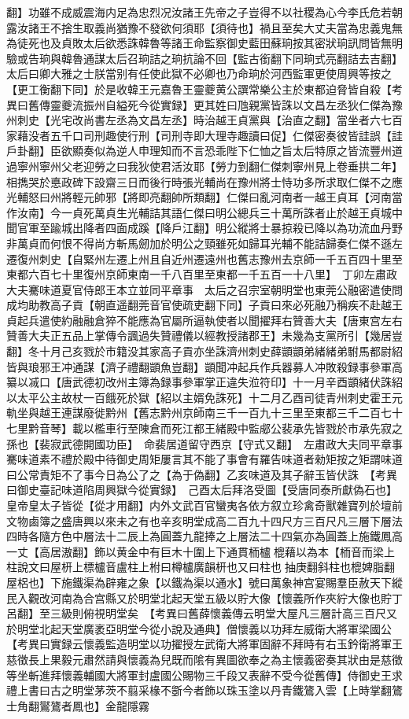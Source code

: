 翻】功雖不成威震海内足為忠烈况汝諸王先帝之子豈得不以社稷為心今李氏危若朝露汝諸王不捨生取義尚猶豫不發欲何須耶【須待也】禍且至矣大丈夫當為忠義鬼無為徒死也及貞敗太后欲悉誅韓魯等諸王命監察御史藍田蘇珦按其密狀珦訊問皆無明驗或告珦與韓魯通謀太后召珦詰之珦抗論不回【監古銜翻下同珦式亮翻詰去吉翻】太后曰卿大雅之士朕當别有任使此獄不必卿也乃命珦於河西監軍更使周興等按之【更工衡翻下同】於是收韓王元嘉魯王靈夔黄公譔常樂公主於東都迫脅皆自殺【考異曰舊傳靈夔流振州自縊死今從實録】更其姓曰虺親黨皆誅以文昌左丞狄仁傑為豫州刺史【光宅改尚書左丞為文昌左丞】時治越王貞黨與【治直之翻】當坐者六七百家藉没者五千口司刑趣使行刑【司刑寺即大理寺趣讀曰促】仁傑密奏彼皆詿誤【詿戶卦翻】臣欲顯奏似為逆人申理知而不言恐乖陛下仁恤之旨太后特原之皆流豐州道過寧州寧州父老迎勞之曰我狄使君活汝耶【勞力到翻仁傑刺寧州見上卷垂拱二年】相擕哭於悳政碑下設齋三日而後行時張光輔尚在豫州將士恃功多所求取仁傑不之應光輔怒曰州將輕元帥邪【將即亮翻帥所類翻】仁傑曰亂河南者一越王貞耳【河南當作汝南】今一貞死萬貞生光輔詰其語仁傑曰明公總兵三十萬所誅者止於越王貞城中聞官軍至踰城出降者四面成蹊【降戶江翻】明公縱將士暴掠殺已降以為功流血丹野非萬貞而何恨不得尚方斬馬劒加於明公之頸雖死如歸耳光輔不能詰歸奏仁傑不遜左遷復州刺史【自緊州左遷上州且自近州遷遠州也舊志豫州去京師一千五百四十里至東都六百七十里復州京師東南一千八百里至東都一千五百一十八里】　丁卯左肅政大夫騫味道夏官侍郎王本立並同平章事　太后之召宗室朝明堂也東莞公融密遣使問成均助教高子貢【朝直遥翻莞音官使疏吏翻下同】子貢曰來必死融乃稱疾不赴越王貞起兵遣使約融融倉猝不能應為官屬所逼執使者以聞擢拜右贊善大夫【唐東宫左右贊善大夫正五品上掌傳令諷過失贊禮儀以經教授諸郡王】未幾為支黨所引【幾居豈翻】冬十月己亥戮於市籍没其家高子貢亦坐誅濟州刺史薛顗顗弟緒緒弟駙馬都尉紹皆與琅邪王冲通謀【濟子禮翻顗魚豈翻】顗聞冲起兵作兵器募人冲敗殺録事參軍高纂以㓕口【唐武德初改州主簿為録事參軍掌正違失涖符印】十一月辛酉顗緒伏誅紹以太平公主故杖一百餓死於獄【紹以主婿免誅死】十二月乙酉司徒青州刺史霍王元軌坐與越王連謀廢徙黔州【舊志黔州京師南三千一百九十三里至東都三千二百七十七里黔音琴】載以檻車行至陳倉而死江都王緒殿中監郕公裴承先皆戮於市承先寂之孫也【裴寂武德開國功臣】　命裴居道留守西京【守式又翻】　左肅政大夫同平章事騫味道素不禮於殿中待御史周矩屢言其不能了事會有羅告味道者勑矩按之矩謂味道曰公常責矩不了事今日為公了之【為于偽翻】乙亥味道及其子辭玉皆伏誅　【考異曰御史臺記味道陷周興獄今從實録】　己酉太后拜洛受圖【受唐同泰所獻偽石也】皇帝皇太子皆從【從才用翻】内外文武百官蠻夷各依方叙立珍禽奇獸雜寶列於壇前文物鹵簿之盛唐興以來未之有也辛亥明堂成高二百九十四尺方三百尺凡三層下層法四時各隨方色中層法十二辰上為圓蓋九龍捧之上層法二十四氣亦為圓蓋上施鐵鳳高一丈【高居滶翻】飾以黄金中有巨木十圍上下通貫栭櫨㮰藉以為本【栭音而梁上柱說文曰屋枅上標櫨音盧柱上柎曰樽櫨廣韻枅也又曰柱也抽庚翻斜柱也㮰婢脂翻屋梠也】下施鐵渠為辟雍之象【以鐵為渠以通水】號曰萬象神宫宴賜羣臣赦天下縱民入觀改河南為合宫縣又於明堂北起天堂五級以貯大像【懷義所作夾紵大像也貯丁呂翻】至三級則俯視明堂矣　【考異曰舊薛懷義傳云明堂大屋凡三層計高三百尺又於明堂北起天堂廣袤亞明堂今從小說及通典】僧懷義以功拜左威衛大將軍梁國公【考異曰實録云懷義監造明堂以功擢授左武衛大將軍固辭不拜時有右玉鈐衛將軍王慈徵長上果毅元肅然請與懷義為兒既而隂有異圖欲奉之為主懷義密奏其狀由是慈徵等坐斬進拜懷義輔國大將軍封盧國公賜物三千段又表辭不受今從舊傳】侍御史王求禮上書曰古之明堂茅茨不翦采椽不斵今者飾以珠玉塗以丹青鐵鷟入雲【上時掌翻鷟士角翻鸑鷟者鳳也】金龍隱霧